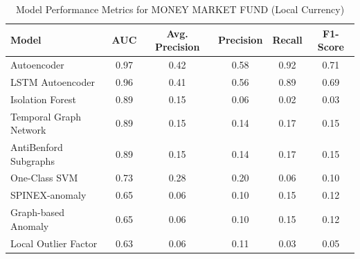 \documentclass[11pt]{article}
\begin{document}
\begin{table}[h]

\centering

\caption{Model Performance Metrics for MONEY MARKET FUND (Local Currency)}

\begin{tabular}{lccccc}

\hline

Model & AUC & Avg. Precision & Precision & Recall & F1-Score \\

\hline

Autoencoder & 0.97 & 0.42 & 0.58 & 0.92 & 0.71 \\

LSTM Autoencoder & 0.96 & 0.41 & 0.56 & 0.89 & 0.69 \\

Isolation Forest & 0.89 & 0.15 & 0.06 & 0.02 & 0.03 \\

Temporal Graph Network & 0.89 & 0.15 & 0.14 & 0.17 & 0.15 \\

AntiBenford Subgraphs & 0.89 & 0.15 & 0.14 & 0.17 & 0.15 \\

One-Class SVM & 0.73 & 0.28 & 0.20 & 0.06 & 0.10 \\

SPINEX-anomaly & 0.65 & 0.06 & 0.10 & 0.15 & 0.12 \\

Graph-based Anomaly & 0.65 & 0.06 & 0.10 & 0.15 & 0.12 \\

Local Outlier Factor & 0.63 & 0.06 & 0.11 & 0.03 & 0.05 \\

\hline

\end{tabular}

\end{table}
\end{document}
